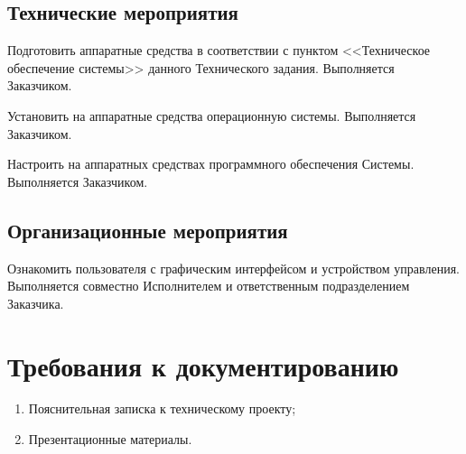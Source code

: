 \section{Технические мероприятия}
Подготовить аппаратные средства в соответствии с пунктом <<Техническое
обеспечение системы>> данного Технического задания. Выполняется Заказчиком.

Установить на аппаратные средства операционную системы. Выполняется Заказчиком.

Настроить на аппаратных средствах программного обеспечения Системы. Выполняется
Заказчиком.

\section{Организационные мероприятия}
Ознакомить пользователя с графическим интерфейсом и устройством управления.
Выполняется совместно Исполнителем и ответственным подразделением Заказчика.

\chapter{Требования к документированию}
\begin{enumerate}
  \item Пояснительная записка к техническому проекту;
  \item Презентационные материалы.
\end{enumerate}
